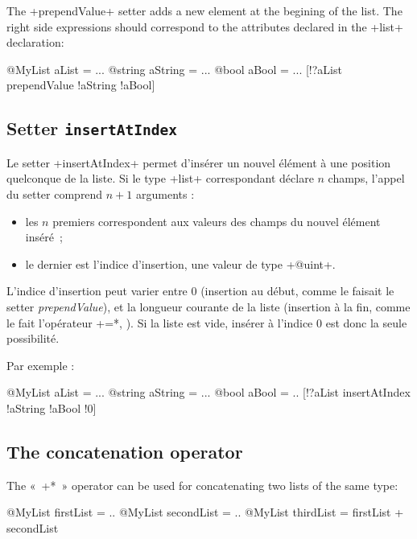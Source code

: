 The \ggs+prependValue+ setter adds a new element at the begining of the list. The right side expressions should correspond to the attributes declared in the  \ggs+list+ declaration:

\begin{galgas}
@MyList aList = ...
@string aString = ...
@bool aBool = ...
[!?aList prependValue !aString !aBool]
\end{galgas}




\subsection{Setter \texttt{insertAtIndex}}

Le setter \ggs+insertAtIndex+ permet d'insérer un nouvel élément à une position quelconque de la liste. Si le type \ggs+list+ correspondant déclare $n$ champs, l'appel du setter comprend $n+1$ arguments :
\begin{itemize}
  \item les $n$ premiers correspondent aux valeurs des champs du nouvel élément inséré~;
  \item le dernier est l'indice d'insertion, une valeur de type \ggs+@uint+.
\end{itemize}

L'indice d'insertion peut varier entre $0$ (insertion au début, comme le faisait le setter \emph{prependValue}), et la longueur courante de la liste (insertion à la fin, comme le fait l'opérateur \ggs*+=*, ). Si la liste est vide, insérer à l'indice $0$ est donc la seule possibilité.

Par exemple :

\begin{galgas}
@MyList aList = ...
@string aString = ...
@bool aBool = ..
[!?aList insertAtIndex !aString !aBool !0]
\end{galgas}

\subsection{The concatenation operator}

The «~\ggs*+*~» operator can be used for concatenating two lists of the same type:


\begin{galgas}
@MyList firstList = ..
@MyList secondList = ..
@MyList thirdList = firstList + secondList
\end{galgas}

